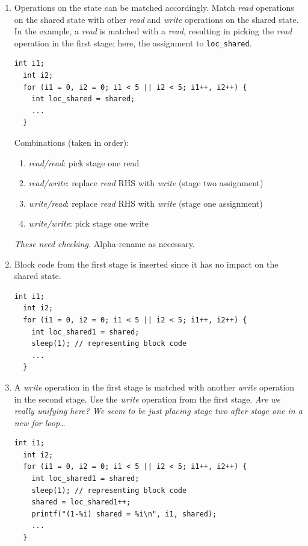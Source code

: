 \documentclass{llncs}
\begin{document}
\begin{enumerate}
\begin{enumerate}
  \item Operations on the state can be matched accordingly. Match \emph{read} operations on the shared state with other \emph{read} and \emph{write} operations on the shared state. In the example, a \emph{read} is matched with a \emph{read}, resulting in picking the \emph{read} operation in the first stage; here, the assignment to \lstinline|loc_shared|.
  \begin{lstlisting}[frame=single]
  int i1;
  int i2;
  for (i1 = 0, i2 = 0; i1 < 5 || i2 < 5; i1++, i2++) {
    int loc_shared = shared;
    ...
  }
  \end{lstlisting}
  Combinations (taken in order):
  \begin{enumerate}
  \item \emph{read/read}: pick stage one read
  \item \emph{read/write}: replace \emph{read} RHS with \emph{write} (stage two assignment)
  \item \emph{write/read}: replace \emph{read} RHS with \emph{write} (stage one assignment)
  \item \emph{write/write}: pick stage one write
  \end{enumerate}
  \emph{These need checking.} Alpha-rename as necessary.
  
  \item Block code from the first stage is inserted since it has no impact on the shared state.
  \begin{lstlisting}[frame=single]
  int i1;
  int i2;
  for (i1 = 0, i2 = 0; i1 < 5 || i2 < 5; i1++, i2++) {
    int loc_shared1 = shared;
    sleep(1); // representing block code
    ...
  }
  \end{lstlisting}
  
  \item A \emph{write} operation in the first stage is matched with another \emph{write} operation in the second stage. Use the \emph{write} operation from the first stage. \emph{Are we really unifying here? We seem to be just placing stage two after stage one in a new for loop\dots}
  \begin{lstlisting}[frame=single]
  int i1;
  int i2;
  for (i1 = 0, i2 = 0; i1 < 5 || i2 < 5; i1++, i2++) {
    int loc_shared1 = shared;
    sleep(1); // representing block code
    shared = loc_shared1++;
    printf("(1-%i) shared = %i\n", i1, shared);
    ...
  }
  \end{lstlisting}
  

\end{enumerate}
\end{enumerate}
\end{document}
